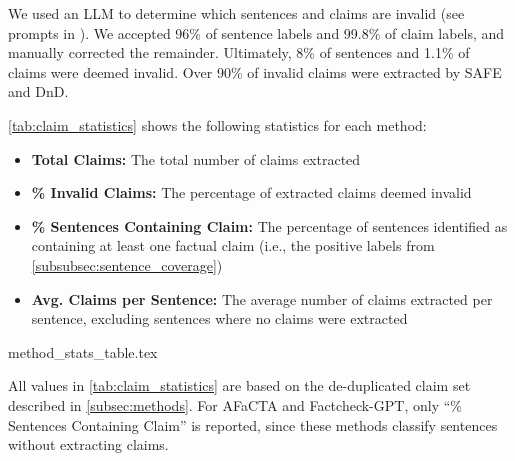 We used an LLM to determine which sentences and claims are invalid (see prompts in ). We accepted 96\% of sentence labels and 99.8\% of claim labels, and manually corrected the remainder. Ultimately, 8\% of sentences and 1.1\% of claims were deemed invalid. Over 90\% of invalid claims were extracted by SAFE and DnD. 

\autoref{tab:claim_statistics} shows the following statistics for each method:
\begin{itemize}
    \item \textbf{Total Claims:} The total number of claims extracted
    \item \textbf{\% Invalid Claims:} The percentage of extracted claims deemed invalid
    \item \textbf{\% Sentences Containing Claim:} The percentage of sentences identified as containing at least one factual claim (i.e., the positive labels from \autoref{subsubsec:sentence_coverage})
    \item \textbf{Avg. Claims per Sentence:} The average number of claims extracted per sentence, excluding sentences where no claims were extracted
\end{itemize}

{method_stats_table.tex}

All values in \autoref{tab:claim_statistics} are based on the de-duplicated claim set described in \autoref{subsec:methods}. For AFaCTA and Factcheck-GPT, only ``\% Sentences Containing Claim'' is reported, since these methods classify sentences without extracting claims. 

